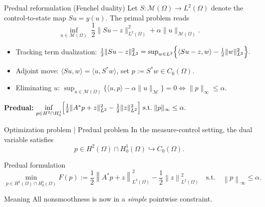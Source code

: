 \documentclass[aspectratio=169]{beamer}
\newcommand{\Om}{\Omega}
\newcommand{\norm}[1]{\left\lVert #1\right\rVert}
\begin{document}
\begin{frame}{Predual reformulation (Fenchel duality)}
\small
Let $S:\mathcal M(\Omega)\to L^2(\Omega)$ denote the control-to-state map $Su=y(u)$.
The primal problem reads
\[
\inf_{u\in\mathcal M(\Omega)}
\; \frac12\|Su-z\|_{L^2(\Omega)}^2+\alpha\|u\|_{\mathcal M(\Omega)}.
\]

\begin{itemize}
  \item Tracking term dualization: $\frac12\|Su-z\|_{L^2}^2
  =\sup_{w\in L^2}\Bigl\{\langle Su-z,w\rangle-\frac12\|w\|_{L^2}^2\Bigr\}.$
  \item Adjoint move: $\langle Su,w\rangle=\langle u,S^\ast w\rangle$, set $p:=S^\ast w\in C_0(\Omega)$.
  \item Eliminating $u$: $
  \sup_{u\in\mathcal M(\Omega)}\{\langle u,p\rangle-\alpha\|u\|_{\mathcal M}\}=0
  \iff \|p\|_\infty\le \alpha. $
\end{itemize}

\medskip
\textbf{Predual:}\;
$
\inf\limits_{p\in H^2\cap H_0^1}
\Bigl[\frac12\|A^\ast p+z\|_{L^2}^2-\frac12\|z\|_{L^2}^2\Bigr]
\;\text{s.t.}\;\|p\|_\infty\le\alpha.
$
\end{frame}


\begin{frame}{Optimization problem | Predual problem}
In the measure-control setting, the dual variable satisfies
\[
p \in H^2(\Om)\cap H^1_0(\Om) \hookrightarrow C_0(\Om).
\]

\begin{block}{Predual formulation}
\[
\min_{p\in H^2(\Om)\cap H^1_0(\Om)}
F(p):=\frac12 \norm{A^\ast p + z}_{L^2(\Om)}^2 - \frac12\norm{z}_{L^2(\Om)}^2
\quad \text{s.t.}\quad \norm{p}_\infty \le \alpha.
\]
\end{block}

\begin{alertblock}{Meaning}
All nonsmoothness is now in a \emph{simple} pointwise constraint.
\end{alertblock}
\end{frame}

\end{document}
